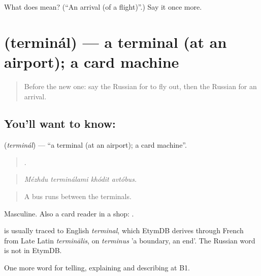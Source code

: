\begin{tcolorbox}[breakable,colback=teal!4,colframe=teal!35!black,title={Before you move on}]
What does  mean? (\textquotedblleft{}An arrival (of a flight)\textquotedblright{}.) Say it once more.
\end{tcolorbox}
\section[\texorpdfstring{\ru{терминал} (terminál)}{терминал (terminál)}]{ (terminál) — a terminal (at an airport); a card machine}

\label{lesson:RU-C422-terminal}



\begin{quote}
Before the new one: say the Russian for to fly out, then the Russian for an arrival.
\end{quote}

\subsection*{You'll want to know: }
\textbf{} (\emph{terminál}) — \textquotedblleft{}a terminal (at an airport); a card machine\textquotedblright{}.

\begin{quote}
   .
\end{quote}

\begin{quote}
\emph{Mézhdu terminálami khódit avtóbus.}
\end{quote}

\begin{quote}
A bus runs between the terminals.
\end{quote}

Masculine. Also a card reader in a shop: \emph{  }.

\begin{cousinweb}
\emph{} is usually traced to English \emph{terminal}, which EtymDB derives through French from Late Latin \emph{terminālis}, on \emph{terminus} 'a boundary, an end'. The Russian word is not in EtymDB.
\end{cousinweb}

\begin{grammarlens}[title={What you've built}]
One more word for telling, explaining and describing at B1.
\end{grammarlens}

